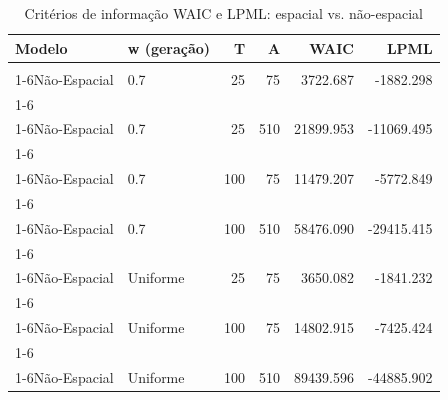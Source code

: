 \documentclass[
]{article}
\begin{document}
\begin{longtable}[t]{llrrrr}
\caption{\label{tab:tab-criteria}Critérios de informação WAIC e LPML: espacial vs. não-espacial}\\
\toprule
Modelo & w (geração) & T & A & WAIC & LPML\\
\midrule
\cellcolor{gray!10}{Espacial} & \cellcolor{gray!10}{0.7} & \cellcolor{gray!10}{25} & \cellcolor{gray!10}{75} & \cellcolor{gray!10}{3722.494} & \cellcolor{gray!10}{-1882.755}\\
\cmidrule{1-6}\pagebreak[0]
Não-Espacial & 0.7 & 25 & 75 & 3722.687 & -1882.298\\
\cmidrule{1-6}\pagebreak[0]
\cellcolor{gray!10}{Espacial} & \cellcolor{gray!10}{0.7} & \cellcolor{gray!10}{25} & \cellcolor{gray!10}{510} & \cellcolor{gray!10}{21925.432} & \cellcolor{gray!10}{-11083.490}\\
\cmidrule{1-6}\pagebreak[0]
Não-Espacial & 0.7 & 25 & 510 & 21899.953 & -11069.495\\
\cmidrule{1-6}\pagebreak[0]
\cellcolor{gray!10}{Espacial} & \cellcolor{gray!10}{0.7} & \cellcolor{gray!10}{100} & \cellcolor{gray!10}{75} & \cellcolor{gray!10}{11479.803} & \cellcolor{gray!10}{-5769.774}\\
\cmidrule{1-6}\pagebreak[0]
Não-Espacial & 0.7 & 100 & 75 & 11479.207 & -5772.849\\
\cmidrule{1-6}\pagebreak[0]
\cellcolor{gray!10}{Espacial} & \cellcolor{gray!10}{0.7} & \cellcolor{gray!10}{100} & \cellcolor{gray!10}{510} & \cellcolor{gray!10}{58489.780} & \cellcolor{gray!10}{-29427.693}\\
\cmidrule{1-6}\pagebreak[0]
Não-Espacial & 0.7 & 100 & 510 & 58476.090 & -29415.415\\
\cmidrule{1-6}\pagebreak[0]
\cellcolor{gray!10}{Espacial} & \cellcolor{gray!10}{Uniforme} & \cellcolor{gray!10}{25} & \cellcolor{gray!10}{75} & \cellcolor{gray!10}{3648.656} & \cellcolor{gray!10}{-1839.520}\\
\cmidrule{1-6}\pagebreak[0]
Não-Espacial & Uniforme & 25 & 75 & 3650.082 & -1841.232\\
\cmidrule{1-6}\pagebreak[0]
\cellcolor{gray!10}{Espacial} & \cellcolor{gray!10}{Uniforme} & \cellcolor{gray!10}{100} & \cellcolor{gray!10}{75} & \cellcolor{gray!10}{14803.565} & \cellcolor{gray!10}{-7429.669}\\
\cmidrule{1-6}\pagebreak[0]
Não-Espacial & Uniforme & 100 & 75 & 14802.915 & -7425.424\\
\cmidrule{1-6}\pagebreak[0]
\cellcolor{gray!10}{Espacial} & \cellcolor{gray!10}{Uniforme} & \cellcolor{gray!10}{100} & \cellcolor{gray!10}{510} & \cellcolor{gray!10}{89441.473} & \cellcolor{gray!10}{-44900.852}\\
\cmidrule{1-6}\pagebreak[0]
Não-Espacial & Uniforme & 100 & 510 & 89439.596 & -44885.902\\
\bottomrule
\end{longtable}
\endgroup{}
\end{document}

